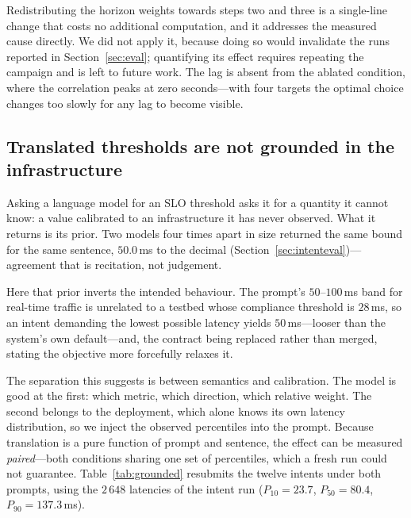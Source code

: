 \documentclass[conference]{IEEEtran}
\begin{document}
Redistributing the horizon weights towards steps two and three is a
single-line change that costs no additional computation, and it addresses the
measured cause directly. We did not apply it, because doing so would
invalidate the runs reported in Section~\ref{sec:eval}; quantifying its
effect requires repeating the campaign and is left to future work. The
lag is absent from the ablated condition, where the correlation peaks at
zero seconds---with four targets the optimal choice changes too slowly for
any lag to become visible.

\subsection{Translated thresholds are not grounded in the infrastructure}
\label{sec:limit-threshold}

Asking a language model for an SLO threshold asks it for a quantity it cannot
know: a value calibrated to an infrastructure it has never observed. What it
returns is its prior. Two models four times apart in size returned the same
bound for the same sentence, $50.0$\,ms to the decimal
(Section~\ref{sec:intenteval})---agreement that is recitation, not judgement.

Here that prior inverts the intended behaviour. The prompt's
$50$--$100$\,ms band for real-time traffic is unrelated to a testbed whose
compliance threshold is $28$\,ms, so an intent demanding the lowest possible
latency yields $50$\,ms---looser than the system's own default---and, the
contract being replaced rather than merged, stating the objective more
forcefully relaxes it.

The separation this suggests is between semantics and calibration. The model
is good at the first: which metric, which direction, which relative weight.
The second belongs to the deployment, which alone knows its own latency
distribution, so we inject the observed percentiles into the prompt. Because
translation is a pure function of prompt and sentence, the effect can be
measured \emph{paired}---both conditions sharing one set of percentiles,
which a fresh run could not guarantee. Table~\ref{tab:grounded} resubmits the
twelve intents under both prompts, using the $2\,648$ latencies of the intent
run ($P_{10}=23.7$, $P_{50}=80.4$, $P_{90}=137.3$\,ms).
\end{document}
